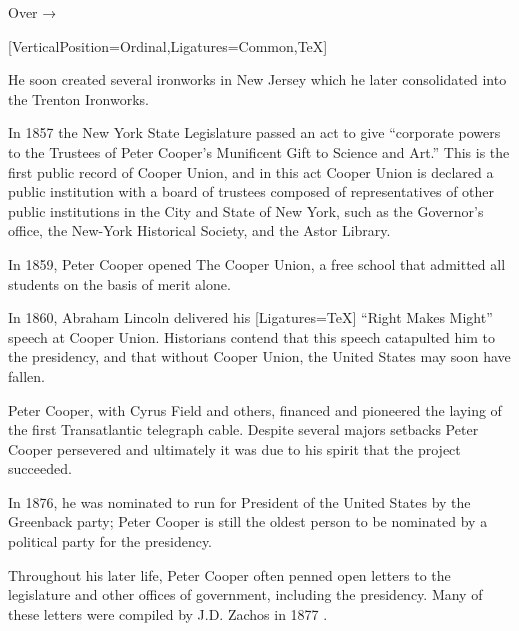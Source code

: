 \documentclass{article}
\begin{document}
\hfill Over { →}
%
%
\newpage{}
%
%
\begin{minipage}[t]{0.46\linewidth}
[VerticalPosition=Ordinal,Ligatures={Common,TeX}]
\fontsize{11pt}{13pt}\selectfont
\raggedright
\upshape
\begin{enumList}
\setcounter{enumListi}{\value{enumTemp}}

\item He soon created several ironworks in New Jersey which he later
consolidated into the { Trenton Ironworks}.

\item In 1857 the New York State Legislature passed an act to give ``corporate
powers to the Trustees of Peter Cooper's Munificent Gift to Science and Art.''
This is the first public record of Cooper Union, and in this act Cooper Union is
declared a { public institution with a board of
trustees composed of representatives of other public institutions in the City and
State of New York}, such as the Governor's office, the New-York Historical
Society, and the Astor Library.

\item In 1859, Peter Cooper opened The Cooper Union, a {
free school that admitted all students on the basis of merit alone.}
\item In 1860, { Abraham Lincoln} delivered his
{[Ligatures=TeX] ``Right Makes Might''} speech at Cooper
Union.
Historians contend that this speech catapulted him to the presidency, and that
{ without Cooper Union, the United States may soon have
fallen.}

\item Peter Cooper, with Cyrus Field and others, financed and
pioneered the laying of the { first Transatlantic
telegraph cable}. Despite several majors setbacks Peter Cooper persevered and
ultimately it was due to his spirit that the project succeeded.

\item In 1876, he was { nominated to run for President of
the United States} by the Greenback party; Peter Cooper is still the
{ oldest person} to be nominated by a political party for
the presidency.

\item Throughout his later life, Peter Cooper often penned open letters to the
legislature and other offices of government, including the presidency. Many of
these letters were compiled by J.D. Zachos in 1877 \cite{opinions}.


\end{enumList}
\end{minipage}
\end{document}
